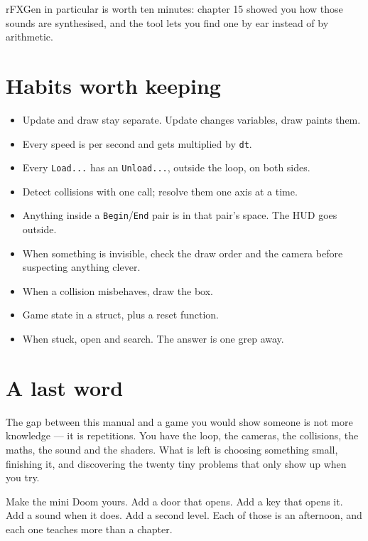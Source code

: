 rFXGen in particular is worth ten minutes: chapter 15 showed you how those sounds
are synthesised, and the tool lets you find one by ear instead of by arithmetic.

\section{Habits worth keeping}

\begin{itemize}[leftmargin=*,itemsep=4pt]
  \item Update and draw stay separate. Update changes variables, draw paints them.
  \item Every speed is per second and gets multiplied by \lstinline|dt|.
  \item Every \lstinline|Load...| has an \lstinline|Unload...|, outside the loop,
        on both sides.
  \item Detect collisions with one call; resolve them one axis at a time.
  \item Anything inside a \lstinline|Begin|/\lstinline|End| pair is in that
        pair's space. The HUD goes outside.
  \item When something is invisible, check the draw order and the camera before
        suspecting anything clever.
  \item When a collision misbehaves, draw the box.
  \item Game state in a struct, plus a reset function.
  \item When stuck, open  and search. The answer is one grep away.
\end{itemize}

\section{A last word}

The gap between this manual and a game you would show someone is not more
knowledge --- it is repetitions. You have the loop, the cameras, the collisions,
the maths, the sound and the shaders. What is left is choosing something small,
finishing it, and discovering the twenty tiny problems that only show up when you
try.

Make the mini Doom yours. Add a door that opens. Add a key that opens it. Add a
sound when it does. Add a second level. Each of those is an afternoon, and each
one teaches more than a chapter.
